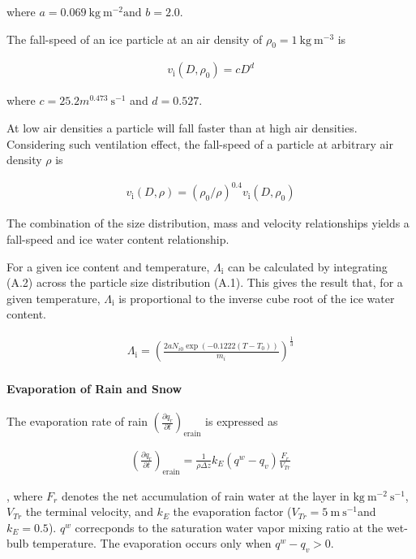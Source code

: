 where \(a=0.069 \mathrm{~kg} \mathrm{~m}^{-2} \text {and } b=2.0\).

The fall-speed of an ice particle at an air density of
\(\rho_{0} = 1\mathrm{~kg} \mathrm{~m}^{-3}\) is

\begin{eqnarray}
v_{\text {i}}(D,\rho_0)=c D^{d}
\label{WB99.A3}
\end{eqnarray}

where \(c=25.2 m^{0.473} \mathrm{~s}^{-1}\) and \(d=0.527 .\)

At low air densities a particle will fall faster than at high air
densities. Considering such ventilation effect, the fall-speed of a
particle at arbitrary air density \(\rho\) is

\begin{eqnarray}
v_{\text {i}}(D,\rho)=\left(\rho_{0} / \rho\right)^{0.4} v_{\text {i}}\left(D,\rho_{0}\right)
\label{WB99.A6}
\end{eqnarray}

The combination of the size distribution, mass and velocity
relationships yields a fall-speed and ice water content relationship.

For a given ice content and temperature, \(\Lambda_{\text {i}}\) can be
calculated by integrating (A.2) across the particle size distribution
(A.1). This gives the result that, for a given temperature,
\(\Lambda_{\text {i}}\) is proportional to the inverse cube root of the
ice water content.

\begin{eqnarray}
\Lambda_{\text {i}} = \left(\frac{2aN_{i0}\exp (-0.1222 (T-T_{0}))}{m_i}\right)^{\frac{1}{3}}
\end{eqnarray}

\hypertarget{evaporation-of-rain-and-snow}{%
\paragraph{Evaporation of Rain and
Snow}\label{evaporation-of-rain-and-snow}}

The evaporation rate of rain
\(\left(\frac{\partial q_r}{\partial t}\right)_{\text {erain}}\) is
expressed as

\begin{eqnarray}
\left(\frac{\partial q_r}{\partial t}\right)_{\text {erain}}
=\frac{1}{\rho \Delta z}k_{E}\left(q^{w}-q_v\right) \frac{F_r}{V_{Tr}}
\end{eqnarray}

, where \(F_r\) denotes the net accumulation of rain water at the layer
in \(\mathrm{kg} \mathrm{~m}^{-2} \mathrm{~s}^{-1}\), \(V_{Tr}\) the
terminal velocity, and \(k_E\) the evaporation factor
(\(V_{Tr} = 5\mathrm{~m} \mathrm{~s}^{-1}\)and \(k_E = 0.5\)). \(q^w\)
correcponds to the saturation water vapor mixing ratio at the wet-bulb
temperature. The evaporation occurs only when \(q^{w}-q_v>0\).

